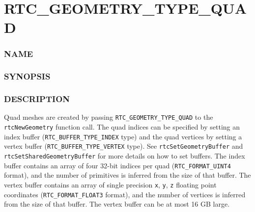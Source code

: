 \section{RTC\_GEOMETRY\_TYPE\_QUAD}\label{rtc_geometry_type_quad}

\subsubsection{NAME}\label{name}

\begin{Shaded}
\begin{Highlighting}[]
\OperatorTok{{-}}
\end{Highlighting}
\end{Shaded}

\subsubsection{SYNOPSIS}\label{synopsis}

\begin{Shaded}
\begin{Highlighting}[]

\OperatorTok{=}
\OperatorTok{(}\OperatorTok{,}\OperatorTok{);}
\end{Highlighting}
\end{Shaded}

\subsubsection{DESCRIPTION}\label{description}

Quad meshes are created by passing \texttt{RTC\_GEOMETRY\_TYPE\_QUAD} to
the \texttt{rtcNewGeometry} function call. The quad indices can be
specified by setting an index buffer (\texttt{RTC\_BUFFER\_TYPE\_INDEX}
type) and the quad vertices by setting a vertex buffer
(\texttt{RTC\_BUFFER\_TYPE\_VERTEX} type). See
\texttt{rtcSetGeometryBuffer} and \texttt{rtcSetSharedGeometryBuffer}
for more details on how to set buffers. The index buffer contains an
array of four 32-bit indices per quad (\texttt{RTC\_FORMAT\_UINT4}
format), and the number of primitives is inferred from the size of that
buffer. The vertex buffer contains an array of single precision
\texttt{x}, \texttt{y}, \texttt{z} floating point coordinates
(\texttt{RTC\_FORMAT\_FLOAT3} format), and the number of vertices is
inferred from the size of that buffer. The vertex buffer can be at most
16 GB large.

